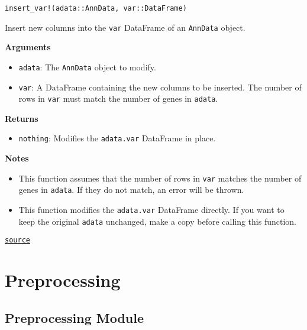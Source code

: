 \documentclass[oneside]{memoir}
\begin{document}
\begin{adjustwidth}{2em}{0pt}


\begin{verbatim}
insert_var!(adata::AnnData, var::DataFrame)
\end{verbatim}

Insert new columns into the \texttt{var} DataFrame of an \texttt{AnnData} object.

\textbf{Arguments}

\begin{itemize}
\item \texttt{adata}: The \texttt{AnnData} object to modify.


\item \texttt{var}: A DataFrame containing the new columns to be inserted. The number of rows in \texttt{var} must match the number of genes in \texttt{adata}.

\end{itemize}
\textbf{Returns}

\begin{itemize}
\item \texttt{nothing}: Modifies the \texttt{adata.var} DataFrame in place.

\end{itemize}
\textbf{Notes}

\begin{itemize}
\item This function assumes that the number of rows in \texttt{var} matches the number of genes in \texttt{adata}. If they do not match, an error will be thrown.


\item This function modifies the \texttt{adata.var} DataFrame directly. If you want to keep the original \texttt{adata} unchanged, make a copy before calling this function.

\end{itemize}


\href{https://github.com/zehua0417/Juscan.jl/blob/393ad1b827b678ea98a738f92af658ee9ed9a403/src/anndata.jl#L381-L396}{\texttt{source}}


\end{adjustwidth}

\chapter{Preprocessing}


\section{Preprocessing Module}
\end{document}
